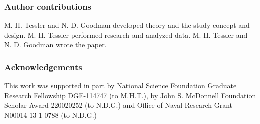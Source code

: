 \documentclass[12pt,letterpaper]{article}
\begin{document}











%

\subsubsection*{Author contributions}
M. H. Tessler and N. D. Goodman developed theory and the study concept and design.
M. H. Tessler performed research and analyzed data.
M. H. Tessler and N. D. Goodman wrote the paper.

\subsubsection*{Acknowledgements}

This work was supported in part by National Science Foundation Graduate Research Fellowship DGE-114747 (to M.H.T.),
by John S. McDonnell Foundation Scholar Award 220020252 (to N.D.G.) and 
Office of Naval Research Grant N00014-13-1-0788 (to N.D.G.)
\end{document}
